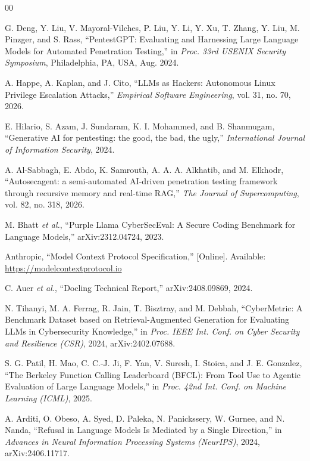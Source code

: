 \documentclass[conference]{IEEEtran}
\begin{document}
\begin{thebibliography}{00}

 G. Deng, Y. Liu, V. Mayoral-Vilches, P. Liu, Y. Li,
Y. Xu, T. Zhang, Y. Liu, M. Pinzger, and S. Rass, ``PentestGPT: Evaluating
and Harnessing Large Language Models for Automated Penetration
Testing,'' in \textit{Proc. 33rd USENIX Security Symposium}, Philadelphia,
PA, USA, Aug. 2024.

 A. Happe, A. Kaplan, and J. Cito, ``LLMs as Hackers:
Autonomous Linux Privilege Escalation Attacks,'' \textit{Empirical
Software Engineering}, vol. 31, no. 70, 2026.

 E. Hilario, S. Azam, J. Sundaram, K. I. Mohammed,
and B. Shanmugam, ``Generative AI for pentesting: the good, the bad, the
ugly,'' \textit{International Journal of Information Security}, 2024.

 A. Al-Sabbagh, E. Abdo, K. Samrouth,
A. A. A. Alkhatib, and M. Elkhodr, ``Autosecagent: a semi-automated
AI-driven penetration testing framework through recursive memory and
real-time RAG,'' \textit{The Journal of Supercomputing}, vol. 82, no. 318,
2026.

 M. Bhatt \textit{et al.}, ``Purple Llama
CyberSecEval: A Secure Coding Benchmark for Language Models,''
arXiv:2312.04724, 2023.

 Anthropic, ``Model Context Protocol Specification,''
[Online]. Available: \url{https://modelcontextprotocol.io}

 C. Auer \textit{et al.}, ``Docling Technical Report,''
arXiv:2408.09869, 2024.

 N. Tihanyi, M. A. Ferrag, R. Jain, T. Bisztray, and
M. Debbah, ``CyberMetric: A Benchmark Dataset based on Retrieval-Augmented
Generation for Evaluating LLMs in Cybersecurity Knowledge,'' in
\textit{Proc. IEEE Int. Conf. on Cyber Security and Resilience (CSR)}, 2024,
arXiv:2402.07688.

 S. G. Patil, H. Mao, C. C.-J. Ji, F. Yan, V. Suresh,
I. Stoica, and J. E. Gonzalez, ``The Berkeley Function Calling Leaderboard
(BFCL): From Tool Use to Agentic Evaluation of Large Language Models,'' in
\textit{Proc. 42nd Int. Conf. on Machine Learning (ICML)}, 2025.

 A. Arditi, O. Obeso, A. Syed, D. Paleka, N. Panickssery,
W. Gurnee, and N. Nanda, ``Refusal in Language Models Is Mediated by a
Single Direction,'' in \textit{Advances in Neural Information Processing
Systems (NeurIPS)}, 2024, arXiv:2406.11717.


\end{thebibliography}
\end{document}
